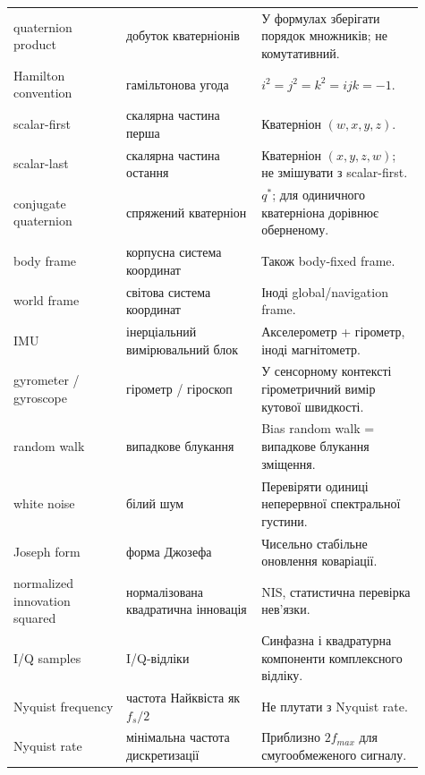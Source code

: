 \begin{longtable}{L{0.25\linewidth}L{0.30\linewidth}L{0.36\linewidth}}
quaternion product & добуток кватерніонів & У формулах зберігати порядок множників; не комутативний.\\
Hamilton convention & гамільтонова угода & $i^2=j^2=k^2=ijk=-1$.\\
scalar-first & скалярна частина перша & Кватерніон $(w,x,y,z)$.\\
scalar-last & скалярна частина остання & Кватерніон $(x,y,z,w)$; не змішувати з scalar-first.\\
conjugate quaternion & спряжений кватерніон & $q^*$; для одиничного кватерніона дорівнює оберненому.\\
body frame & корпусна система координат & Також body-fixed frame.\\
world frame & світова система координат & Іноді global/navigation frame.\\
IMU & інерціальний вимірювальний блок & Акселерометр + гірометр, іноді магнітометр.\\
gyrometer / gyroscope & гірометр / гіроскоп & У сенсорному контексті гірометричний вимір кутової швидкості.\\
random walk & випадкове блукання & Bias random walk = випадкове блукання зміщення.\\
white noise & білий шум & Перевіряти одиниці неперервної спектральної густини.\\
Joseph form & форма Джозефа & Чисельно стабільне оновлення коваріації.\\
normalized innovation squared & нормалізована квадратична інновація & NIS, статистична перевірка нев'язки.\\
I/Q samples & I/Q-відліки & Синфазна і квадратурна компоненти комплексного відліку.\\
Nyquist frequency & частота Найквіста як $f_s/2$ & Не плутати з Nyquist rate.\\
Nyquist rate & мінімальна частота дискретизації & Приблизно $2f_{max}$ для смугообмеженого сигналу.\\
\bottomrule
\end{longtable}

